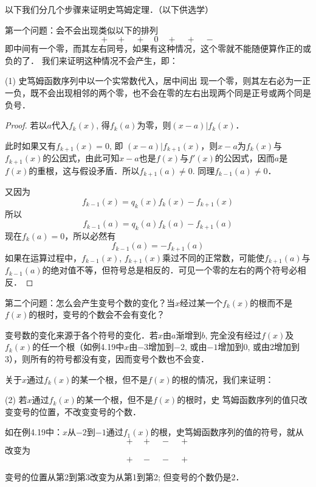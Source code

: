以下我们分几个步骤来证明史笃姆定理．（以下供选学）

第一个问题：会不会出现类似以下的排列
\[+\quad +\quad +\quad 0\quad +\quad +\quad -\]
即中间有一个零，而其左右同号，如果有这种情况，这个零就不能随便算作正的或负的了．
我们来证明这种情况不会产生，即：
\begin{blk}{}
   (1) 史笃姆函数序列中以一个实常数代入，居中间出
现一个零，则其左右必为一正一负，既不会出现相邻的两个零，也不会在零的左右出现两个同是正号或两个同是负号． 
\end{blk}


\begin{proof}
若以$a$代入$f_k(x)$, 得$f_k(a)$为零，则$(x-a) |f_k (x)$．

此时如果又有$f_{k+1}(x)=0$, 即 $(x-a) |f_{k+1} (x)$，则$x-a$为$f_k(x)$与$f_{k+1}(x)$的公因式，由此可知$x-a$也是$f(x)$与$f'(x)$的公因式，因而$a$是$f(x)$的重根，这与假设矛盾．所以$f_{k+1}(a)\ne 0$. 同理$f_{k-1}(a)\ne 0$．

又因为$$f_{k-1}(x)=q_k(x)f_k(x)-f_{k+1}(x)$$所以$$f_{k-1}(a)=q_k(a)f_k(a)-f_{k+1}(a)$$
现在$f_k(a)=0$，所以必然有$$f_{k-1}(a)=-f_{k+1}(a)$$
如果在运算过程中，$f_{k-1}(x)$, $f_{k+1}(x)$乘过不同的正常数，可能使$f_{k+1}(a)$与$f_{k-1}(a)$的绝对值不等，但符号总是相反的．可见一个零的左右的两个符号必相反．
\end{proof}

第二个问题：怎么会产生变号个数的变化？当$x$经过某一个$f_k(x)$的根而不是$f(x)$的根时，变号的个数会不会有变化？

变号数的变化来源于各个符号的变化．若$x$由$a$渐增到$b$, 完全没有经过$f(x)$及$f_k(x)$的任一个根（如例4.19中$x$由$-3$增加到$-2$, 或由$-1$增加到0, 或由2增加到3），则所有的符号都没有变，因而变号个数也不会变．

关于$x$通过$f_k(x)$的某一个根，但不是$f(x)$的根的情况，我们来证明：
\begin{blk}{}
    (2) 若$x$通过$f_k(x)$的某一个根，但不是$f(x)$的根时，史
笃姆函数序列的值只改变变号的位置，不改变变号的个数．
\end{blk}

如在例4.19中：$x$从$-2$到$-1$通过$f_1(x)$的根，史笃姆函数序列的值的符号，就从
\[+\quad +\quad -\quad +\]
改变为
\[+\quad -\quad -\quad +\]

变号的位置从第2到第3改变为从第1到第2; 但变号的个数仍是2．

